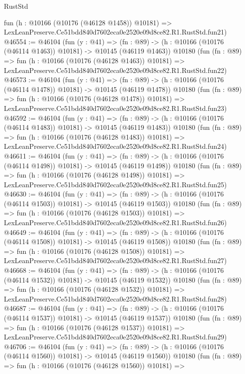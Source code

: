 \begin{lexlean}{RustStd}
\begin{coremodule}
    fun (h : @10166 (@10176 (@46128 @1458)) @10181) =>
    LexLeanPreserve.Ce51bdd840d7602eca0e2520e09d8ce82.R1.RustStd.fun21)
@46554 := @46104
    (fun (y : @41) =>
    (fn : @89) -> (h : @10166 (@10176 (@46114 @1463)) @10181) -> @10145 (@46119 @1463))
    @10180
    (fun (fn : @89) =>
    fun (h : @10166 (@10176 (@46128 @1463)) @10181) =>
    LexLeanPreserve.Ce51bdd840d7602eca0e2520e09d8ce82.R1.RustStd.fun22)
@46573 := @46104
    (fun (y : @41) =>
    (fn : @89) -> (h : @10166 (@10176 (@46114 @1478)) @10181) -> @10145 (@46119 @1478))
    @10180
    (fun (fn : @89) =>
    fun (h : @10166 (@10176 (@46128 @1478)) @10181) =>
    LexLeanPreserve.Ce51bdd840d7602eca0e2520e09d8ce82.R1.RustStd.fun23)
@46592 := @46104
    (fun (y : @41) =>
    (fn : @89) -> (h : @10166 (@10176 (@46114 @1483)) @10181) -> @10145 (@46119 @1483))
    @10180
    (fun (fn : @89) =>
    fun (h : @10166 (@10176 (@46128 @1483)) @10181) =>
    LexLeanPreserve.Ce51bdd840d7602eca0e2520e09d8ce82.R1.RustStd.fun24)
@46611 := @46104
    (fun (y : @41) =>
    (fn : @89) -> (h : @10166 (@10176 (@46114 @1498)) @10181) -> @10145 (@46119 @1498))
    @10180
    (fun (fn : @89) =>
    fun (h : @10166 (@10176 (@46128 @1498)) @10181) =>
    LexLeanPreserve.Ce51bdd840d7602eca0e2520e09d8ce82.R1.RustStd.fun25)
@46630 := @46104
    (fun (y : @41) =>
    (fn : @89) -> (h : @10166 (@10176 (@46114 @1503)) @10181) -> @10145 (@46119 @1503))
    @10180
    (fun (fn : @89) =>
    fun (h : @10166 (@10176 (@46128 @1503)) @10181) =>
    LexLeanPreserve.Ce51bdd840d7602eca0e2520e09d8ce82.R1.RustStd.fun26)
@46649 := @46104
    (fun (y : @41) =>
    (fn : @89) -> (h : @10166 (@10176 (@46114 @1508)) @10181) -> @10145 (@46119 @1508))
    @10180
    (fun (fn : @89) =>
    fun (h : @10166 (@10176 (@46128 @1508)) @10181) =>
    LexLeanPreserve.Ce51bdd840d7602eca0e2520e09d8ce82.R1.RustStd.fun27)
@46668 := @46104
    (fun (y : @41) =>
    (fn : @89) -> (h : @10166 (@10176 (@46114 @1532)) @10181) -> @10145 (@46119 @1532))
    @10180
    (fun (fn : @89) =>
    fun (h : @10166 (@10176 (@46128 @1532)) @10181) =>
    LexLeanPreserve.Ce51bdd840d7602eca0e2520e09d8ce82.R1.RustStd.fun28)
@46687 := @46104
    (fun (y : @41) =>
    (fn : @89) -> (h : @10166 (@10176 (@46114 @1537)) @10181) -> @10145 (@46119 @1537))
    @10180
    (fun (fn : @89) =>
    fun (h : @10166 (@10176 (@46128 @1537)) @10181) =>
    LexLeanPreserve.Ce51bdd840d7602eca0e2520e09d8ce82.R1.RustStd.fun29)
@46706 := @46104
    (fun (y : @41) =>
    (fn : @89) -> (h : @10166 (@10176 (@46114 @1560)) @10181) -> @10145 (@46119 @1560))
    @10180
    (fun (fn : @89) =>
    fun (h : @10166 (@10176 (@46128 @1560)) @10181) =>

\end{coremodule}
\end{lexlean}
